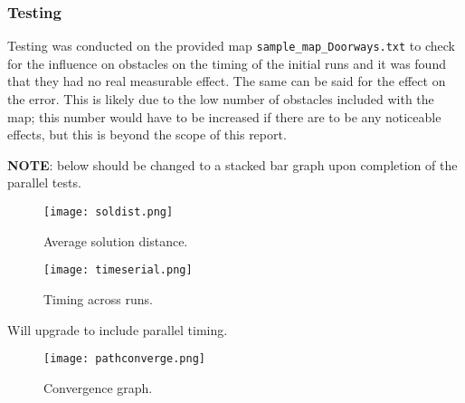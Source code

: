 \documentclass[KomodoMain.tex]{subfiles}
\begin{document}
\subsubsection{Testing}
Testing was conducted on the provided map \texttt{sample\_map\_Doorways.txt} to check for the influence on obstacles on the timing of the initial runs and it was found that they had no real measurable effect. The same can be said for the effect on the error. This is likely due to the low number of obstacles included with the map; this number would have to be increased if there are to be any noticeable effects, but this is beyond the scope of this report.
\par
\textbf{NOTE}: below should be changed to a stacked bar graph upon completion of the parallel tests.

\begin{figure}[!htbp]
\caption{Average solution distance.}
\centering
\texttt{[image: soldist.png]}
\end{figure}

\begin{figure}[!htbp]
\caption{Timing across runs.}
\centering
\texttt{[image: timeserial.png]}
\end{figure}

\begin{remark}
Will upgrade to include parallel timing.
\end{remark}

\begin{figure}[!htbp]
\caption{Convergence graph.}
\centering
\texttt{[image: pathconverge.png]}
\end{figure}



\newpage
\end{document}

